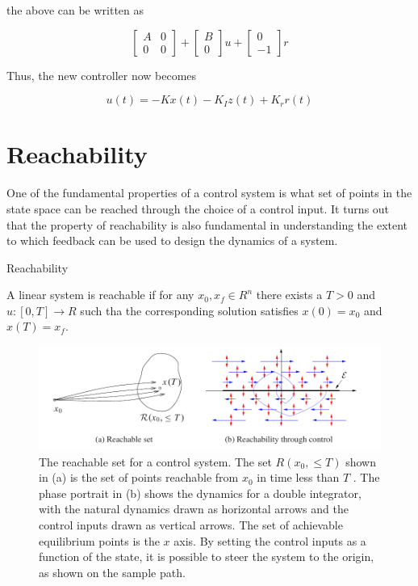 the above can be written as

\begin{equation}
\begin{bmatrix}
 A & 0 \\
 0 & 0 
\end{bmatrix} +  
\begin{bmatrix}
 B \\
 0 
\end{bmatrix}u +
\begin{bmatrix}
 0 \\
 -1  
\end{bmatrix}r
\end{equation}

Thus, the new controller now becomes

\begin{equation}
u(t) = - Kx(t) - K_I z(t) + K_r r(t)
\end{equation}

\section{Reachability}
One of the fundamental properties of a control system is what set of points in the
state space can be reached through the choice of a control input. It turns out that the
property of reachability is also fundamental in understanding the extent to which
feedback can be used to design the dynamics of a system.

\begin{framed}
\theoremstyle{definition}
\begin{definition}{Reachability}

A linear system is reachable if for any $x_0, x_f \in R^n$ there exists a $T > 0$ and $u: [0,T] \rightarrow R$ such tha the corresponding solution satisfies $x(0) = x_0$ and $x(T) = x_f$.
\end{definition}
\end{framed}


\begin{figure}[!htb]
\begin{center}
\includegraphics[scale=0.280]{img/state_feedback/reachability.jpeg}
\end{center}
\caption{The reachable set for a control system. The set $R(x_0,\leq T )$ shown in (a) is the set
of points reachable from $x_0$ in time less than $T$ . The phase portrait in (b) shows the dynamics
for a double integrator, with the natural dynamics drawn as horizontal arrows and the control
inputs drawn as vertical arrows. The set of achievable equilibrium points is the $x$ axis. By
setting the control inputs as a function of the state, it is possible to steer the system to the
origin, as shown on the sample path.}
\label{reachability}
\end{figure}


